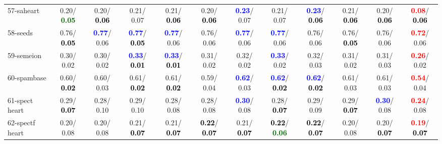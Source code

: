 \begin{table}[h]
\begin{center}
{\begin{tabular}{lc|c|c|c|c|c|c|c|c|c|c}
57-saheart &   0.20/\textcolor{darkgreen}{\textbf{  0.05}} &   0.20/\textcolor{black}{\textbf{  0.06}} &   0.21/  0.07 &   0.21/\textcolor{black}{\textbf{  0.06}} &   0.20/\textcolor{black}{\textbf{  0.06}} & \textcolor{blue}{\textbf{  0.23}}/  0.07 &   0.21/  0.07 & \textcolor{blue}{\textbf{  0.23}}/\textcolor{black}{\textbf{  0.06}} &   0.21/\textcolor{black}{\textbf{  0.06}} &   0.20/\textcolor{black}{\textbf{  0.06}} & \textcolor{red}{\textbf{  0.08}}/\textcolor{black}{\textbf{  0.06}} \\
58-seeds &   0.76/\textcolor{black}{\textbf{  0.05}} & \textcolor{blue}{\textbf{  0.77}}/  0.06 & \textcolor{blue}{\textbf{  0.77}}/\textcolor{black}{\textbf{  0.05}} & \textcolor{blue}{\textbf{  0.77}}/  0.06 &   0.76/  0.06 & \textcolor{blue}{\textbf{  0.77}}/  0.06 & \textcolor{blue}{\textbf{  0.77}}/  0.06 &   0.76/  0.06 &   0.76/\textcolor{black}{\textbf{  0.05}} &   0.76/  0.06 & \textcolor{red}{\textbf{  0.72}}/  0.06 \\
59-semeion &   0.30/  0.02 &   0.30/  0.02 & \textcolor{blue}{\textbf{  0.33}}/\textcolor{black}{\textbf{  0.01}} & \textcolor{blue}{\textbf{  0.33}}/\textcolor{black}{\textbf{  0.01}} &   0.31/  0.02 &   0.32/  0.02 & \textcolor{blue}{\textbf{  0.33}}/  0.02 &   0.32/  0.03 &   0.31/  0.02 &   0.31/  0.03 & \textcolor{red}{\textbf{  0.26}}/  0.02 \\
60-spambase &   0.60/\textcolor{black}{\textbf{  0.02}} &   0.60/  0.03 &   0.61/\textcolor{black}{\textbf{  0.02}} &   0.61/\textcolor{black}{\textbf{  0.02}} &   0.59/  0.04 & \textcolor{blue}{\textbf{  0.62}}/  0.03 & \textcolor{blue}{\textbf{  0.62}}/\textcolor{black}{\textbf{  0.02}} & \textcolor{blue}{\textbf{  0.62}}/\textcolor{black}{\textbf{  0.02}} &   0.61/  0.03 &   0.61/  0.03 & \textcolor{red}{\textbf{  0.54}}/  0.04 \\ \hline
61-spect heart &   0.29/\textcolor{black}{\textbf{  0.07}} &   0.28/  0.10 &   0.29/  0.10 &   0.28/  0.08 &   0.28/  0.08 & \textcolor{blue}{\textbf{  0.30}}/  0.08 &   0.28/\textcolor{black}{\textbf{  0.07}} &   0.29/  0.09 &   0.29/\textcolor{black}{\textbf{  0.07}} & \textcolor{blue}{\textbf{  0.30}}/  0.08 & \textcolor{red}{\textbf{  0.24}}/  0.08 \\
62-spectf heart &   0.20/  0.08 &   0.20/  0.08 &   0.21/\textcolor{black}{\textbf{  0.07}} &   0.21/\textcolor{black}{\textbf{  0.07}} & \textcolor{black}{\textbf{  0.22}}/\textcolor{black}{\textbf{  0.07}} &   0.21/\textcolor{black}{\textbf{  0.07}} & \textcolor{black}{\textbf{  0.22}}/\textcolor{darkgreen}{\textbf{  0.06}} & \textcolor{black}{\textbf{  0.22}}/\textcolor{black}{\textbf{  0.07}} &   0.20/  0.08 &   0.20/\textcolor{black}{\textbf{  0.07}} & \textcolor{red}{\textbf{  0.19}}/\textcolor{black}{\textbf{  0.07}} \\

\end{tabular}}
\end{center}
\end{table}
